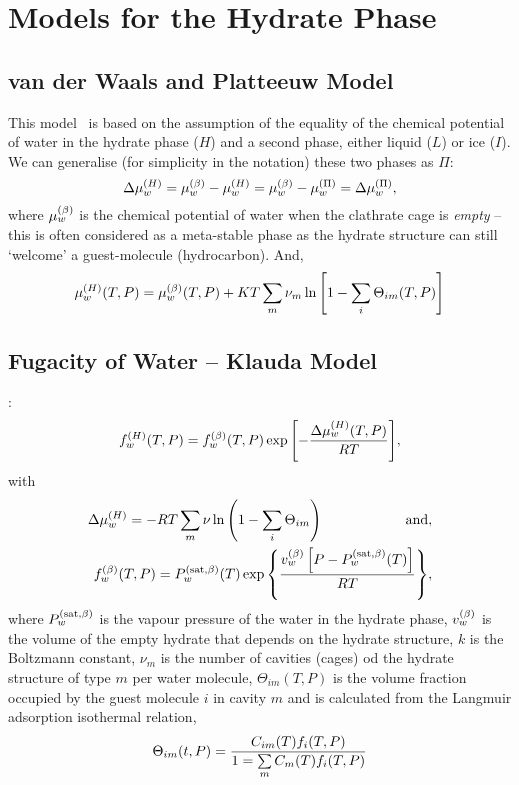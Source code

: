 \section{Models for the Hydrate Phase}\label{Chapter:Hydrate:Section:HydrateModels}


\subsection{van der Waals and Platteeuw Model}\label{Chapter:Hydrate:Section:HydrateModels:Section:vdW_Platteeuw}
This model~\citep{vdWP_1959} is based on the assumption of the equality of the chemical potential of water in the hydrate phase ($H$) and a second phase, either liquid ($L$) or ice ($I$). We can generalise (for simplicity in the notation) these two phases as $\Pi$:
   \begin{equation}
      \Delta\mfr[\mu]{w}{H} = \mfr[\mu]{w}{\beta} - \mfr[\mu]{w}{H} =  \mfr[\mu]{w}{\beta} - \mfr[\mu]{w}{\Pi} = \Delta\mfr[\mu]{w}{\Pi},
   \end{equation}
where $\mfr[\mu]{w}{\beta}$ is the chemical potential of water when the clathrate cage is {\it empty} -- this is often considered as a meta-stable phase as the hydrate structure can still `welcome' a guest-molecule (hydrocarbon). And,
   \begin{equation}
     \mfr[\mu]{w}{H}(T,P) = \mfr[\mu]{w}{\beta}(T,P) + KT\summation_{m}\nu_{m}\ln{\left[1-\summation_{i}\Theta_{im}(T,P)\right]}
   \end{equation}

\subsection{Fugacity of Water -- Klauda Model}\label{Chapter:Hydrate:Section:HydrateModels:Section:FugacityWater}
\citet{klauda_2000}:
   \begin{equation}
      \mfr[f]{w}{H}(T,P) = \mfr[f]{w}{\beta}(T,P)\exp{\left[-\frc{\Delta\mfr[\mu]{w}{H}(T,P)}{RT}\right]},
   \end{equation}
with 
   \begin{eqnarray}
       \Delta\mfr[\mu]{w}{H} = -RT\summation_{m}\nu_{}\ln{\left(1-\summation_{i}\Theta_{im}\right)}\hspace{2cm}\text{ and}, \\
       \mfr[f]{w}{\beta}(T,P) = \mfr[P]{w}{\text{sat},\beta}(T)\exp{\left\{\frc{\mfr[v]{w}{\beta}\left[P-\mfr[P]{w}{\text{sat},\beta}(T)\right]}{RT}\right\}},
   \end{eqnarray}
where $\mfr[P]{w}{\text{sat},\beta}$ is the vapour pressure of the water in the hydrate phase, $\mfr[v]{w}{\beta}$ is the volume of the empty hydrate that depends on the hydrate structure, $k$ is the Boltzmann constant, $\nu_{m}$ is the number of cavities (\ie cages) od the hydrate structure of type $m$ per water molecule, $\Theta_{im}(T,P)$ is the volume fraction occupied by the guest molecule $i$ in cavity $m$ and is calculated from the Langmuir adsorption isothermal relation,
   \begin{equation}
      \Theta_{im}(t,P) = \frc{C_{im}(T)f_{i}(T,P)}{1=\summation_{m}C_{m}(T)f_{i}(T,P)}
   \end{equation}

